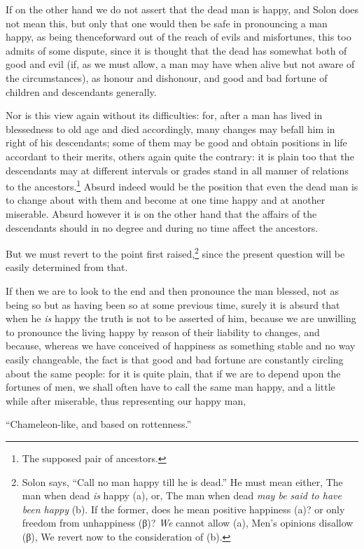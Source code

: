 If on the other hand we do not assert that the dead man is happy, and Solon
does not mean this, but only that one would then be safe in pronouncing a man
happy, as being thenceforward out of the reach of evils and misfortunes, this
too admits of some dispute, since it is thought that the dead has somewhat both
of good and evil (if, as we must allow, a man may have when alive but not aware
of the circumstances), as honour and dishonour, and good and bad fortune of
children and descendants generally.

Nor is this view again without its difficulties: for, after a man has lived in
blessedness to old age and died accordingly, many changes may befall him in
right of his descendants; some of them may be good and obtain positions in life
accordant to their merits, others again quite the contrary: it is plain too
that the descendants may at different intervals or grades stand in all manner
of relations to the ancestors.\footnote{The supposed pair of ancestors.}
Absurd indeed would be the position that even the dead man is to change about
with them and become at one time happy and at another miserable. Absurd however
it is on the other hand that the affairs of the descendants should in no degree
and during no time affect the ancestors.

But we must revert to the point first raised,\footnote{Solon says, “Call no man happy till he is dead.” He must mean
either, The man when dead \emph{is} happy (a), or, The man when dead \emph{may be
said to have been happy} (b). If the former, does he mean positive happiness
(a)? or only freedom from unhappiness (β)? \emph{We} cannot allow (a),
Men’s opinions disallow (β), We revert now to the consideration of
(b).}
since the present question will be easily determined from that.

If then we are to look to the end and then pronounce the man blessed, not as
being so but as having been so at some previous time, surely it is absurd that
when he \emph{is} happy the truth is not to be asserted of him, because we are
unwilling to pronounce the living happy by reason of their liability to
changes, and because, whereas we have conceived of happiness as something
stable and no way easily changeable, the fact is that good and bad fortune are
constantly circling about the same people: for it is quite plain, that if we
are to depend upon the fortunes of men, we shall often have to call the same
man happy, and a little while after miserable, thus representing our happy man,

“Chameleon-like, and based on rottenness.”

